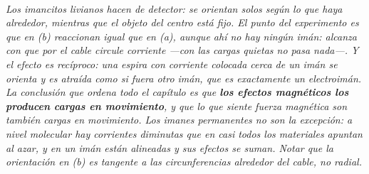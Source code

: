 \begin{center}
\\[0.5em]
{\small\itshape Los imancitos livianos hacen de detector: se orientan solos
según lo que haya alrededor, mientras que el objeto del centro está fijo. El
punto del experimento es que en (b) reaccionan igual que en (a), aunque ahí no
hay ningún imán: alcanza con que por el cable circule corriente ---con las
cargas quietas no pasa nada---. Y el efecto es recíproco: una espira con
corriente colocada cerca de un imán se orienta y es atraída como si fuera otro
imán, que es exactamente un electroimán. La conclusión que ordena todo el
capítulo es que \textbf{los efectos magnéticos los producen cargas en
movimiento}, y que lo que siente fuerza magnética son también cargas en
movimiento. Los imanes permanentes no son la excepción: a nivel molecular hay
corrientes diminutas que en casi todos los materiales apuntan al azar, y en un
imán están alineadas y sus efectos se suman. Notar que la orientación en (b) es
\emph{tangente} a las circunferencias alrededor del cable, no radial.}
\end{center}
